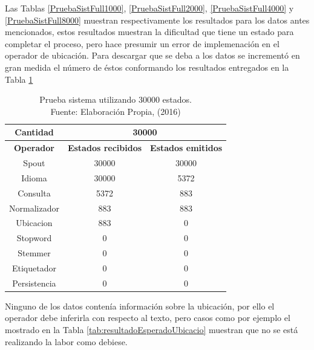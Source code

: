 Las Tablas \ref{PruebaSistFull1000}, \ref{PruebaSistFull2000}, \ref{PruebaSistFull4000} y \ref{PruebaSistFull8000} muestran respectivamente los resultados para los datos antes mencionados, estos resultados muestran la dificultad que tiene un estado para completar el proceso, pero hace presumir un error de implemenación en el operador de ubicación. Para descargar que se deba a los datos se incrementó en gran medida el número de éstos conformando los resultados entregados en la Tabla \ref{tab:PruebaSistFull30000}

\begin{table}[H]
\centering
\caption[Prueba sistema utilizando 30000 estados.]{Prueba sistema utilizando 30000 estados.\\Fuente: Elaboración Propia, (2016)}
\label{tab:PruebaSistFull30000}
\begin{tabular}{|c|c|c|}
\hline
\textbf{Cantidad} & \multicolumn{2}{c|}{\textbf{30000}} \\ \hline
\textbf{Operador} & \multicolumn{1}{c|}{\textbf{Estados recibidos}} & \multicolumn{1}{c|}{\textbf{Estados emitidos}} \\ \hline
Spout & 30000 & 30000 \\ \hline
Idioma & 30000 & 5372 \\ \hline
Consulta & 5372 & 883 \\ \hline
Normalizador & 883 & 883 \\ \hline
Ubicacion & 883 & 0 \\ \hline
Stopword & 0 & 0 \\ \hline
Stemmer & 0 & 0 \\ \hline
Etiquetador & 0 & 0 \\ \hline
Persistencia & 0 & 0 \\ \hline
\end{tabular}
\end{table}

 Ninguno de los datos contenía información sobre la ubicación, por ello el operador debe inferirla con respecto al texto, pero casos como por ejemplo el mostrado en la Tabla \ref{tab:resultadoEsperadoUbicacio} muestran que no se está realizando la labor como debiese.

